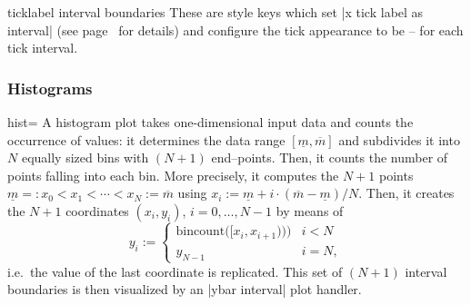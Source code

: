 {\begin{pgfplotsxykey}{\x ticklabel interval boundaries}
	These are style keys which set |x tick label as interval| (see page~\pageref{key:pgfplots:ticklabelasinterval} for details) and configure the tick appearance to be  --  for each tick interval.
\end{pgfplotsxykey}

\subsubsection{Histograms}
\begin{plottype}[/pgfplots]{hist=\textcolor{black}{\normalfont{}}}
	A histogram plot takes one-dimensional input data and counts the occurrence of values: it determines the data range $[\underline m,\overline m]$ and subdivides it into $N$ equally sized bins with $(N+1)$ end--points. Then, it counts the number of points falling into each bin. More precisely, it computes the $N+1$ points $\underline m =: x_0 < x_1 < \dotsb < x_N := \overline m$ using $x_i := \underline m + i \cdot (\overline m - \underline m)/N$. Then, it creates the $N+1$ coordinates $(x_i, y_i)$, $i=0,\dotsc,N-1$ by means of
	\[
  y_i := 
  \begin{cases}
  \text{bincount}\bigl([x_i,x_{i+1})\bigr)\Bigr) & i<N\\
  y_{N-1} & i = N,
\end{cases}
	\]
	i.e.\ the value of the last coordinate is replicated.
	This set of $(N+1)$ interval boundaries is then visualized by an |ybar interval| plot handler.
\begin{codeexample}[]
\end{codeexample}
\end{plottype}}
